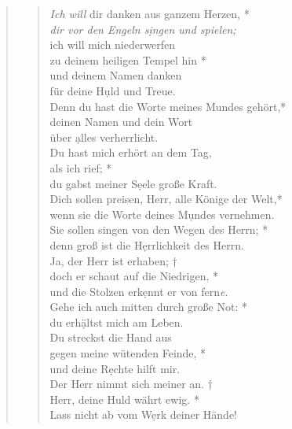 
\vspace{0.3cm}


\begin{quote}
\begin{verse}
\textit{Ich will} dir danken aus ganzem Herzen, *\\ 
\textit{dir vor den Engeln s\d ingen und spielen;} \\ 
\vin ich will mich niederwerfen\\ 
\vin zu deinem heiligen Tempel hin *\\ 
\vin und deinem Namen danken\\ 
\vin für deine H\d uld und Treue.\\ 
Denn du hast die Worte meines Mundes gehört,*\\  
deinen Namen und dein Wort\\
über \d alles verherrlicht.\\ 
\vin Du hast mich erhört an dem Tag,\\ 
\vin als ich rief; *\\ 
\vin du gabst meiner S\d eele große Kraft.\\ 
Dich sollen preisen, Herr, alle Könige der Welt,*\\ 
wenn sie die Worte deines M\d undes vernehmen.\\ 
\vin Sie sollen singen von den Wegen des Herrn; *\\ 
\vin denn groß ist die H\d errlichkeit des Herrn.\\ 
Ja, der Herr ist erhaben; †\\
doch er schaut auf die Niedrigen, *\\  
und die Stolzen erk\d ennt er von fern\textit{e}.\\ 
\vin Gehe ich auch mitten durch große Not: *\\ 
\vin du erh\d ältst mich am Leben.\\  
Du streckst die Hand aus\\
gegen meine wütenden Feinde, *\\  
und deine R\d echte hilft mir.\\ 
\vin Der Herr nimmt sich meiner an. †\\ 
\vin Herr, deine Huld währt ewig. *\\ 
\vin Lass nicht ab vom W\d erk deiner Hände!\\

\end{verse}
\end{quote}




